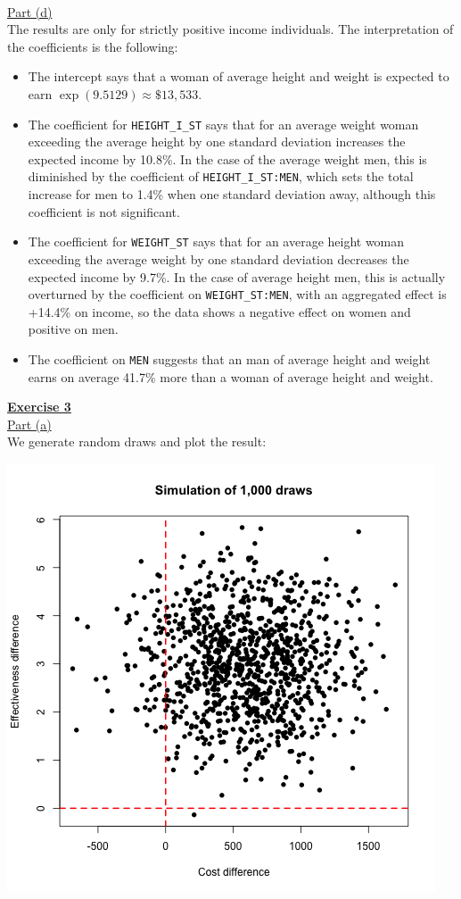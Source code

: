 \documentclass[a4paper, 11pt]{article}
\begin{document}
\newline \\
\newline \underline{Part (d)}\\
\newline The results are only for strictly positive income individuals. The interpretation of the coefficients is the following:
\begin{itemize}
\item The intercept says that a woman of average height and weight is expected to earn $\exp{(9.5129)} \approx \$13,533$.
\item The coefficient for \texttt{HEIGHT\_I\_ST} says that for an average weight woman exceeding the average height by one standard deviation increases the expected income by 10.8\%. In the case of the average weight men, this is diminished by the coefficient of \texttt{HEIGHT\_I\_ST:MEN}, which sets the total increase for men to 1.4\% when one standard deviation away, although this coefficient is not significant.
\item The coefficient for \texttt{WEIGHT\_ST} says that for an average height woman exceeding the average weight by one standard deviation decreases the expected income by 9.7\%. In the case of average height men, this is actually overturned by the coefficient on \texttt{WEIGHT\_ST:MEN}, with an aggregated effect is +14.4\% on income, so the data shows a negative effect on women and positive on men.
\item The coefficient on \texttt{MEN} suggests that an man of average height and weight earns on average 41.7\% more than a woman of average height and weight.
\end{itemize}
\newpage
\textbf{\underline{Exercise 3}}\\
\newline \underline{Part (a)}\\
\newline We generate random draws and plot the result:
\begin{center}
\includegraphics[scale=0.6]{plot_ex3dot1.png}
\end{center}
\end{document}
